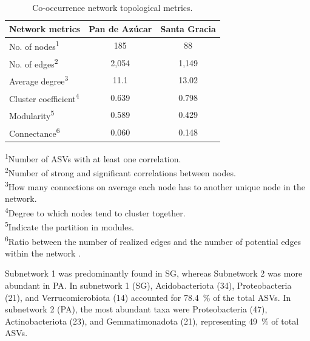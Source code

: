 \begin{table}[ht]
	\centering
	\caption{Co-occurrence network topological metrics.}
	\label{tab:M3-T1}
	\begin{tabular}{lcc}
	\hline
	\textbf{Network metrics} & \textbf{Pan de Azúcar} & \textbf{Santa Gracia} \\
	\hline
	No. of nodes\textsuperscript{1} & 185 & 88 \\
	No. of edges\textsuperscript{2} & 2,054 & 1,149 \\
	Average degree\textsuperscript{3} & 11.1 & 13.02 \\
	Cluster coefficient\textsuperscript{4} & 0.639 & 0.798 \\
	Modularity\textsuperscript{5} & 0.589 & 0.429 \\
	Connectance\textsuperscript{6} & 0.060 & 0.148 \\
	\hline
	\end{tabular}
	
	\vspace{0.5em}
	\begin{minipage}{0.9\textwidth}
	\footnotesize
	\textsuperscript{1}Number of ASVs with at least one correlation.\\
	\textsuperscript{2}Number of strong and significant correlations between nodes.\\
	\textsuperscript{3}How many connections on average each node has to another unique node in the network.\\
	\textsuperscript{4}Degree to which nodes tend to cluster together.\\
	\textsuperscript{5}Indicate the partition in modules.\\
	\textsuperscript{6}Ratio between the number of realized edges and the number of potential edges within the network \citep{DiniAndreote2014, Karimi2017}.
	\end{minipage}
	\end{table}
	
	

Subnetwork 1 was predominantly found in SG, whereas Subnetwork 2 was more abundant in PA. In subnetwork 1 (SG), Acidobacteriota (34), Proteobacteria (21), and Verrucomicrobiota (14) accounted for \SI{78.4}{\percent} of the total ASVs. In subnetwork 2 (PA), the most abundant taxa were Proteobacteria (47), Actinobacteriota (23), and Gemmatimonadota (21), representing \SI{49}{\percent} of total ASVs.

